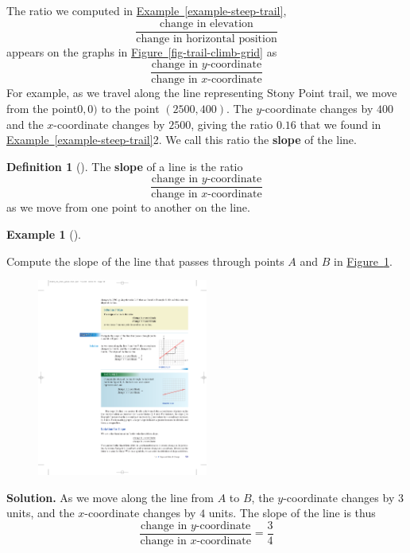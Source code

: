 \documentclass[10pt,]{book}
\newcommand{\terminology}[1]{\textbf{#1}}
\theoremstyle{plain}
\theoremstyle{definition}
\newtheorem{definition}[theorem]{Definition}
\theoremstyle{definition}
\theoremstyle{definition}
\newtheorem{example}[theorem]{Example}
\theoremstyle{definition}
\theoremstyle{definition}
\numberwithin{equation}{section}
\begin{document}
    The ratio we computed in \hyperref[example-steep-trail]{Example~\ref{example-steep-trail}},
    \begin{equation*}\frac{\text{change in elevation}}{\text{change in horizontal position}}\end{equation*}  
    appears on the graphs in \hyperref[fig-trail-climb-grid]{Figure~\ref{fig-trail-climb-grid}} as
    \begin{equation*}\frac{\text{change in }y\text{-coordinate}}{\text{change in }x\text{-coordinate}}\end{equation*} 
    For example, as we travel along the line representing Stony Point trail, we move from the point\(0, 0)\) to the point \((2500, 400)\). The \(y\)-coordinate changes by \(400\) and the \(x\)-coordinate changes by \(2500\), giving the ratio \(0.16\) that we found in \hyperref[example-steep-trail]{Example~\ref{example-steep-trail}}2. We call this ratio the \terminology{slope} of the line.
%
\begin{definition}[]\label{definition-slope}
The \terminology{slope} of a line is the ratio
    \begin{equation*}\frac{\text{change in }y\text{-coordinate}}{\text{change in }x\text{-coordinate}}\end{equation*} 
    as we move from one point to another on the line.
\end{definition}
\begin{example}[]\label{example-slope-grid}

    Compute the slope of the line that passes through points \(A\) and \(B\) in \hyperref[fig-slope-grid]{Figure~\ref{fig-slope-grid}}.
%
\leavevmode%
\begin{figure}
\centering
\includegraphics[width=0.50\textwidth,]{images/fig-slope-grid.pdf}\caption{\label{fig-slope-grid}}
\end{figure}
\par\medskip\noindent%
\textbf{Solution.}\quad 
    As we move along the line from \(A\) to \(B\), the \(y\)-coordinate changes by \(3\) units, and the \(x\)-coordinate changes by \(4\) units. The slope of the line is thus
    \begin{equation*}\frac{\text{change in }y\text{-coordinate}}{\text{change in }x\text{-coordinate}}=\frac{3}{4}\end{equation*}\end{example}
\end{document}
